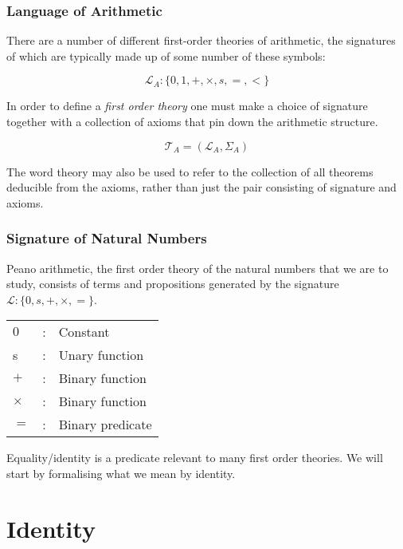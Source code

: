 \documentclass{beamer}
\theoremstyle{indentDefn} \newtheorem{defn}[]{Definition}
\begin{document}
\begin{frame}
	\frametitle{Language of Arithmetic}

	There are a number of different first-order theories of arithmetic, the signatures of which are typically made up of some number of these symbols:

	$$\mathcal{L}_{A} : \{0,1,+,\times,s,=,<\} $$

	In order to define a \emph{first order theory} one must make a choice of signature together with a collection of axioms that pin down the arithmetic structure. 

	$$\mathcal{T}_{A} = (\mathcal{L}_{A}, \Sigma_{A})$$

	The word theory may also be used to refer to the collection of all theorems deducible from the axioms, rather than just the pair consisting of signature and axioms. 
\end{frame}

\begin{frame}
	\frametitle{Signature of Natural Numbers}

	Peano arithmetic, the first order theory of the natural numbers that we are to study, consists of terms and propositions generated by the signature $\mathcal{L} : \{0,s,+,\times,=\}$.

	\begin{center}
		\begin{tabular}{l c l}
			$0$ & : & Constant \\
			s & : & Unary function \\
			$+$ & : & Binary function \\
			$\times$ & : & Binary function \\
			$=$ & : & Binary predicate
		\end{tabular}
	\end{center}

	\vspace{25mm}

	Equality/identity is a predicate relevant to many first order theories. We will start by formalising what we mean by identity. 

\end{frame}

\section{Identity}
\end{document}
